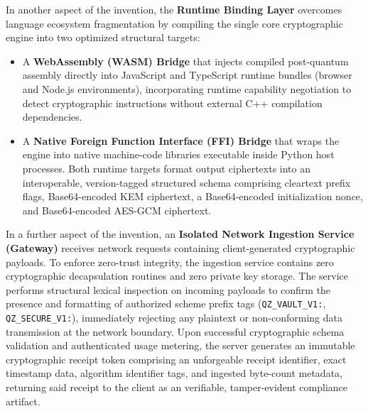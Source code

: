 \documentclass[12pt, a4paper]{article}
\begin{document}
In another aspect of the invention, the \textbf{Runtime Binding Layer} overcomes language ecosystem fragmentation by compiling the single core cryptographic engine into two optimized structural targets:
\begin{itemize}
    \item A \textbf{WebAssembly (WASM) Bridge} that injects compiled post-quantum assembly directly into JavaScript and TypeScript runtime bundles (browser and Node.js environments), incorporating runtime capability negotiation to detect cryptographic instructions without external C++ compilation dependencies.
    \item A \textbf{Native Foreign Function Interface (FFI) Bridge} that wraps the engine into native machine-code libraries executable inside Python host processes. Both runtime targets format output ciphertexts into an interoperable, version-tagged structured schema comprising cleartext prefix flags, Base64-encoded KEM ciphertext, a Base64-encoded initialization nonce, and Base64-encoded AES-GCM ciphertext.
\end{itemize}

In a further aspect of the invention, an \textbf{Isolated Network Ingestion Service (Gateway)} receives network requests containing client-generated cryptographic payloads. To enforce zero-trust integrity, the ingestion service contains zero cryptographic decapsulation routines and zero private key storage. The service performs structural lexical inspection on incoming payloads to confirm the presence and formatting of authorized scheme prefix tags (\texttt{QZ\_VAULT\_V1:}, \texttt{QZ\_SECURE\_V1:}), immediately rejecting any plaintext or non-conforming data transmission at the network boundary. Upon successful cryptographic schema validation and authenticated usage metering, the server generates an immutable cryptographic receipt token comprising an unforgeable receipt identifier, exact timestamp data, algorithm identifier tags, and ingested byte-count metadata, returning said receipt to the client as an verifiable, tamper-evident compliance artifact.
\end{document}
